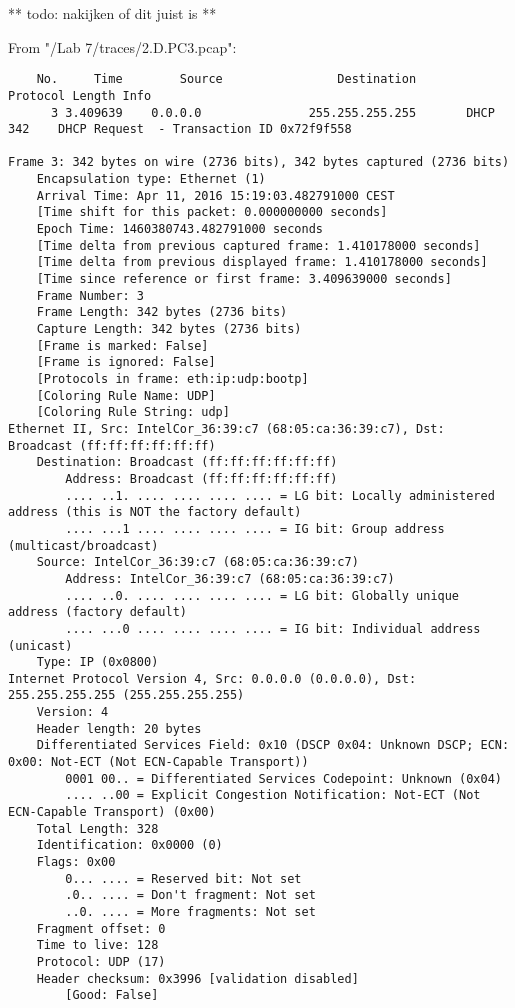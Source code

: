** todo: nakijken of dit juist is **

From "/Lab 7/traces/2.D.PC3.pcap":

\begin{lstlisting}
    No.     Time        Source                Destination           Protocol Length Info
      3 3.409639    0.0.0.0               255.255.255.255       DHCP     342    DHCP Request  - Transaction ID 0x72f9f558

Frame 3: 342 bytes on wire (2736 bits), 342 bytes captured (2736 bits)
    Encapsulation type: Ethernet (1)
    Arrival Time: Apr 11, 2016 15:19:03.482791000 CEST
    [Time shift for this packet: 0.000000000 seconds]
    Epoch Time: 1460380743.482791000 seconds
    [Time delta from previous captured frame: 1.410178000 seconds]
    [Time delta from previous displayed frame: 1.410178000 seconds]
    [Time since reference or first frame: 3.409639000 seconds]
    Frame Number: 3
    Frame Length: 342 bytes (2736 bits)
    Capture Length: 342 bytes (2736 bits)
    [Frame is marked: False]
    [Frame is ignored: False]
    [Protocols in frame: eth:ip:udp:bootp]
    [Coloring Rule Name: UDP]
    [Coloring Rule String: udp]
Ethernet II, Src: IntelCor_36:39:c7 (68:05:ca:36:39:c7), Dst: Broadcast (ff:ff:ff:ff:ff:ff)
    Destination: Broadcast (ff:ff:ff:ff:ff:ff)
        Address: Broadcast (ff:ff:ff:ff:ff:ff)
        .... ..1. .... .... .... .... = LG bit: Locally administered address (this is NOT the factory default)
        .... ...1 .... .... .... .... = IG bit: Group address (multicast/broadcast)
    Source: IntelCor_36:39:c7 (68:05:ca:36:39:c7)
        Address: IntelCor_36:39:c7 (68:05:ca:36:39:c7)
        .... ..0. .... .... .... .... = LG bit: Globally unique address (factory default)
        .... ...0 .... .... .... .... = IG bit: Individual address (unicast)
    Type: IP (0x0800)
Internet Protocol Version 4, Src: 0.0.0.0 (0.0.0.0), Dst: 255.255.255.255 (255.255.255.255)
    Version: 4
    Header length: 20 bytes
    Differentiated Services Field: 0x10 (DSCP 0x04: Unknown DSCP; ECN: 0x00: Not-ECT (Not ECN-Capable Transport))
        0001 00.. = Differentiated Services Codepoint: Unknown (0x04)
        .... ..00 = Explicit Congestion Notification: Not-ECT (Not ECN-Capable Transport) (0x00)
    Total Length: 328
    Identification: 0x0000 (0)
    Flags: 0x00
        0... .... = Reserved bit: Not set
        .0.. .... = Don't fragment: Not set
        ..0. .... = More fragments: Not set
    Fragment offset: 0
    Time to live: 128
    Protocol: UDP (17)
    Header checksum: 0x3996 [validation disabled]
        [Good: False]

\end{lstlisting}
